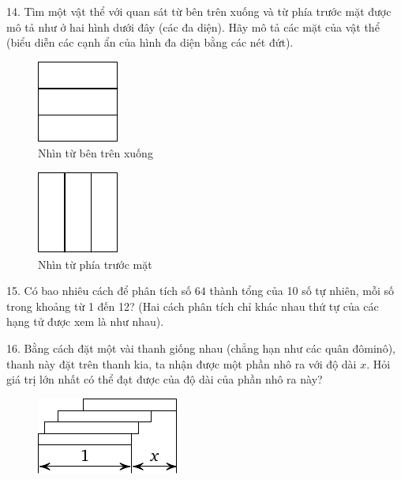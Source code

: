 \begin{problem}{14.}
	Tìm một vật thể với quan sát  từ  bên trên xuống và từ phía trước mặt  được mô tả như ở hai hình dưới đây (các đa diện). Hãy mô tả các mặt của vật thể  (biểu diễn các cạnh ẩn của hình đa diện bằng các nét đứt).
	\begin{figure}
		\footnotesize
		\null\hfill
		\parbox{0.2\linewidth}{\centering\includegraphics{taskbook-99}\\Nhìn từ bên trên xuống}
		\hfill
		\parbox{0.2\linewidth}{\centering\includegraphics{taskbook-98}\\Nhìn từ phía trước mặt }
		\hfill\null
	\end{figure}
\end{problem}

\begin{problem}{15.}
	Có bao nhiêu cách để phân tích số $64$ thành tổng của 10 số tự nhiên, mỗi số trong khoảng từ 1 đến 12? (Hai cách phân tích chỉ khác nhau thứ tự của các hạng tử được xem là như nhau).
\end{problem}

\begin{problem}{16.}
	Bằng cách đặt một vài thanh giống nhau (chẳng hạn như các quân đôminô), thanh này đặt trên thanh kia, ta nhận được một phần nhô ra với độ dài $x$. Hỏi giá trị lớn nhất có thể đạt được của độ dài của phần nhô ra này?
	\begin{figure}
		\includegraphics{taskbook-97}
	\end{figure}
\end{problem}

